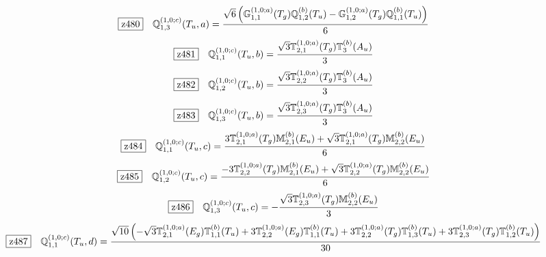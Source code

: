 \documentclass[fleqn,10pt,landscape]{jsarticle}
\begin{document}
\begin{dmath*}
\hspace*{3mm}\fbox{z480}\quad \mathbb{Q}_{1,3}^{(1,0;c)}(T_{u},a)=\frac{\sqrt{6} \left(\mathbb{G}_{1,1}^{(1,0;a)}(T_{g}) \mathbb{Q}_{1,2}^{(b)}(T_{u}) - \mathbb{G}_{1,2}^{(1,0;a)}(T_{g}) \mathbb{Q}_{1,1}^{(b)}(T_{u})\right)}{6}
\end{dmath*}
\begin{dmath*}
\hspace*{3mm}\fbox{z481}\quad \mathbb{Q}_{1,1}^{(1,0;c)}(T_{u},b)=\frac{\sqrt{3} \mathbb{T}_{2,1}^{(1,0;a)}(T_{g}) \mathbb{T}_{3}^{(b)}(A_{u})}{3}
\end{dmath*}
\begin{dmath*}
\hspace*{3mm}\fbox{z482}\quad \mathbb{Q}_{1,2}^{(1,0;c)}(T_{u},b)=\frac{\sqrt{3} \mathbb{T}_{2,2}^{(1,0;a)}(T_{g}) \mathbb{T}_{3}^{(b)}(A_{u})}{3}
\end{dmath*}
\begin{dmath*}
\hspace*{3mm}\fbox{z483}\quad \mathbb{Q}_{1,3}^{(1,0;c)}(T_{u},b)=\frac{\sqrt{3} \mathbb{T}_{2,3}^{(1,0;a)}(T_{g}) \mathbb{T}_{3}^{(b)}(A_{u})}{3}
\end{dmath*}
\begin{dmath*}
\hspace*{3mm}\fbox{z484}\quad \mathbb{Q}_{1,1}^{(1,0;c)}(T_{u},c)=\frac{3 \mathbb{T}_{2,1}^{(1,0;a)}(T_{g}) \mathbb{M}_{2,1}^{(b)}(E_{u}) + \sqrt{3} \mathbb{T}_{2,1}^{(1,0;a)}(T_{g}) \mathbb{M}_{2,2}^{(b)}(E_{u})}{6}
\end{dmath*}
\begin{dmath*}
\hspace*{3mm}\fbox{z485}\quad \mathbb{Q}_{1,2}^{(1,0;c)}(T_{u},c)=\frac{- 3 \mathbb{T}_{2,2}^{(1,0;a)}(T_{g}) \mathbb{M}_{2,1}^{(b)}(E_{u}) + \sqrt{3} \mathbb{T}_{2,2}^{(1,0;a)}(T_{g}) \mathbb{M}_{2,2}^{(b)}(E_{u})}{6}
\end{dmath*}
\begin{dmath*}
\hspace*{3mm}\fbox{z486}\quad \mathbb{Q}_{1,3}^{(1,0;c)}(T_{u},c)=- \frac{\sqrt{3} \mathbb{T}_{2,3}^{(1,0;a)}(T_{g}) \mathbb{M}_{2,2}^{(b)}(E_{u})}{3}
\end{dmath*}
\begin{dmath*}
\hspace*{3mm}\fbox{z487}\quad \mathbb{Q}_{1,1}^{(1,0;c)}(T_{u},d)=\frac{\sqrt{10} \left(- \sqrt{3} \mathbb{T}_{2,1}^{(1,0;a)}(E_{g}) \mathbb{T}_{1,1}^{(b)}(T_{u}) + 3 \mathbb{T}_{2,2}^{(1,0;a)}(E_{g}) \mathbb{T}_{1,1}^{(b)}(T_{u}) + 3 \mathbb{T}_{2,2}^{(1,0;a)}(T_{g}) \mathbb{T}_{1,3}^{(b)}(T_{u}) + 3 \mathbb{T}_{2,3}^{(1,0;a)}(T_{g}) \mathbb{T}_{1,2}^{(b)}(T_{u})\right)}{30}
\end{dmath*}
\end{document}
